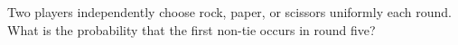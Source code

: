 Two players independently choose rock, paper, or scissors uniformly each round. What is the probability that the first non-tie occurs in round five?
